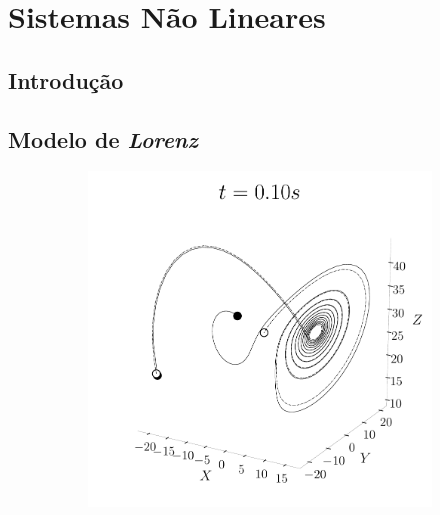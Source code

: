 \chapter{Sistemas Não Lineares}
\label{chapter:cap3}
\section{\textbf{Introdução}}

\section{\textbf{Modelo de \textit{Lorenz}}}
\begin{figure}[H]
    \begin{subfigure}{.5\textwidth}
    \centering
    \includegraphics[width=1.\linewidth, angle=0, clip]{03_Cap3/figures/Lorenzatractor0_10.pdf}
    \end{subfigure}
    \begin{subfigure}{.5\textwidth}
    \centering

\end{subfigure}
\end{figure}
